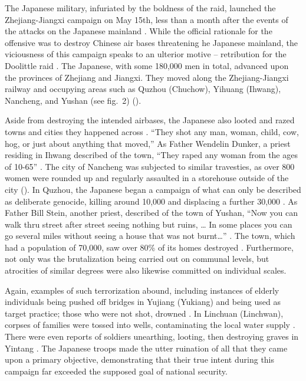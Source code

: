 \documentclass[12pt, a4paper, twoside]{article}
\begin{document}
The Japanese military, infuriated by the boldness of the raid, launched the Zhejiang-Jiangxi campaign on May 15th, less than a month after the events of the attacks on the Japanese mainland \autocite[p.\ 386]{Schoppa2011SeaOfBitterness}. While the official rationale for the offensive was to destroy Chinese air bases threatening he Japanese mainland, the viciousness of this campaign speaks to an ulterior motive – retribution for the Doolittle raid \autocite[pp.\ 375--376]{Scott2015TargetTokyo}. The Japanese, with some 180,000 men in total, advanced upon the provinces of Zhejiang and Jiangxi. They moved along the Zhejiang-Jiangxi railway and occupying areas such as Quzhou (Chuchow), Yihuang (Ihwang), Nancheng, and Yushan (see fig.\ 2) (\cites[p.\ 28]{Schoppa2011SeaOfBitterness}{Carter2023ComplexLegacyDoolittleRaid}{Zhao2016LifetimeOfSufferingChinaDaily}).

Aside from destroying the intended airbases, the Japanese also looted and razed towns and cities they happened across \autocite[chap.\ 22]{Scott2015TargetTokyo}. “They shot any man, woman, child, cow, hog, or just about anything that moved,” As Father Wendelin Dunker, a priest residing in Ihwang described of the town, “They raped any woman from the ages of 10-65” \autocite[p.\ 381]{Scott2015TargetTokyo}. The city of Nancheng was subjected to similar travesties, as over 800 women were rounded up and regularly assaulted in a storehouse outside of the city (\cites[p.\ 382]{Scott2018MilitaryTimesRipples}). In Quzhou, the Japanese began a campaign of what can only be described as deliberate genocide, killing around 10,000 and displacing a further 30,000 \autocite[p.\ 385]{Scott2015TargetTokyo}. As Father Bill Stein, another priest, described of the town of Yushan, “Now you can walk thru street after street seeing nothing but ruins, … In some places you can go several miles without seeing a house that was not burnt…” \autocite[p.\ 385]{Scott2015TargetTokyo}. The town, which had a population of 70,000, saw over 80\% of its homes destroyed \autocite[p.\ 166]{Yamamoto2000Nanking}. Furthermore, not only was the brutalization being carried out on communal levels, but atrocities of similar degrees were also likewise committed on individual scales.

Again, examples of such terrorization abound, including instances of elderly individuals being pushed off bridges in Yujiang (Yukiang) and being used as target practice; those who were not shot, drowned \autocite[p.\ 382]{Scott2015TargetTokyo}. In Linchuan (Linchwan), corpses of families were tossed into wells, contaminating the local water supply \autocite[p.\ 383]{Scott2015TargetTokyo}. There were even reports of soldiers unearthing, looting, then destroying graves in Yintang \autocite[p.\ 383]{Scott2015TargetTokyo}. The Japanese troops made the utter ruination of all that they came upon a primary objective, demonstrating that their true intent during this campaign far exceeded the supposed goal of national security.
\end{document}
